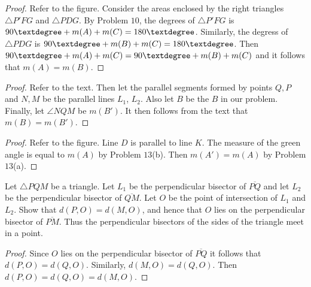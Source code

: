 \begin{proof}
    Refer to the figure. Consider the areas enclosed by the right triangles 
        $\triangle P'FG$ and $\triangle PDG$.
    By Problem $10$, the degrees of $\triangle P'FG$ is $90\textdegree + m(A) + m(C) = 180\textdegree$.
    Similarly, the degress of $\triangle PDG$ is $90\textdegree + m(B) + m(C) = 180\textdegree$.
    Then $90\textdegree + m(A) + m(C) = 90\textdegree + m(B) + m(C)$
        and it follows that $m(A) = m(B)$.
\end{proof}

\begin{proof}
    Refer to the text. Then let the parallel segments formed by points $Q, P$ and $N, M$
        be the parallel lines $L_1$, $L_2$. Also let $B$ be the $B$ in our problem.
    Finally, let $\angle NQM$ be $m(B')$.
    It then follows from the text that $m(B) = m(B')$.
\end{proof}

\begin{proof}
    Refer to the figure. Line $D$ is parallel to line $K$.
    The measure of the green angle is equal to $m(A)$ by Problem $13$(b).
    Then $m(A') = m(A)$ by Problem $13$(a).
\end{proof}

\begin{tcolorbox}[title=Problem 14, breakable]
    Let $\triangle PQM$ be a triangle. Let $L_1$ be the perpendicular bisector of $\overline{PQ}$
    and let $L_2$ be the perpendicular bisector of $\overline{QM}$. Let $O$ be the point of
    intersection of $L_1$ and $L_2$. Show that $d(P, O) = d(M, O)$, and hence that
    $O$ lies on the perpendicular bisector of $\overline{PM}$. Thus the perpendicular
    bisectors of the sides of the triangle meet in a point.
\end{tcolorbox}

\begin{proof}
    Since $O$ lies on the perpendicular bisector of $\overline{PQ}$
        it follows that $d(P, O) = d(Q, O)$.
    Similarly, $d(M, O) = d(Q, O)$.
    Then $d(P, O) = d(Q, O) = d(M, O)$.
\end{proof}
